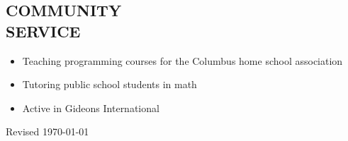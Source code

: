 \documentclass[margin, 10pt]{res} %
\begin{document}
\begin{resume}

\section{COMMUNITY \\ SERVICE}

\begin{itemize} \itemsep -2pt %

\item Teaching programming courses for the Columbus home school association
\item Tutoring public school students in math
\item Active in Gideons International
\end{itemize}

\vspace*{\fill}
\tiny{Revised \today}

%
%
%
%
%
%
%
%
%
%
\end{resume}
\end{document}
